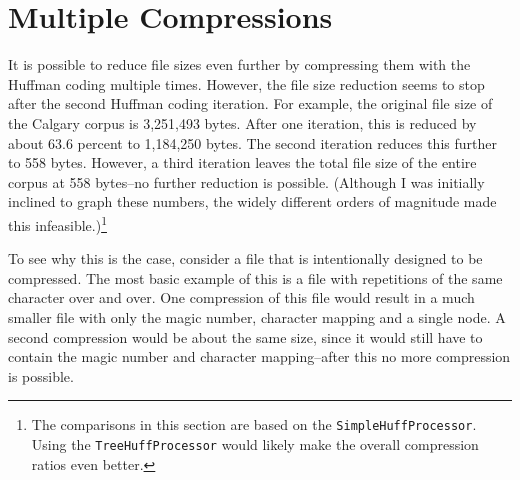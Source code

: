 \documentclass[12pt]{article}
\begin{document}
\section{Multiple Compressions}

It is possible to reduce file sizes even further by compressing them with the Huffman coding multiple times. However, the file size reduction seems to stop after the second Huffman coding iteration. For example, the original file size of the Calgary corpus is 3,251,493 bytes. After one iteration, this is reduced by about 63.6 percent to 1,184,250 bytes. The second iteration reduces this further to 558 bytes. However, a third iteration leaves the total file size of the entire corpus at 558 bytes--no further reduction is possible. (Although I was initially inclined to graph these numbers, the widely different orders of magnitude made this infeasible.)\footnote{The comparisons in this section are based on the \texttt{SimpleHuffProcessor}. Using the \texttt{TreeHuffProcessor} would likely make the overall compression ratios even better.}

To see why this is the case, consider a file that is intentionally designed to be compressed. The most basic example of this is a file with repetitions of the same character over and over. One compression of this file would result in a much smaller file with only the magic number, character mapping and a single node. A second compression would be about the same size, since it would still have to contain the magic number and character mapping--after this no more compression is possible.
\end{document}
